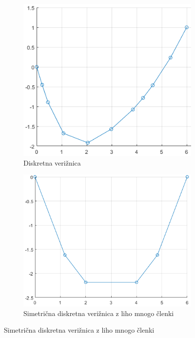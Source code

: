 \documentclass[A4paper, 11pt]{article}
\begin{document}
\begin{figure}[h]
\begin{subfigure}{.5\textwidth}
\includegraphics[scale=0.5]{diskretna_premaknjena}
\caption{Diskretna verižnica}
\end{subfigure}
\begin{subfigure}{.5\textwidth}
\includegraphics[scale=0.5]{simetricna_liha}
\caption{Simetrična diskretna verižnica z liho mnogo členki}
\end{subfigure}
\end{figure}

\hspace{0.5cm}

\end{document}
